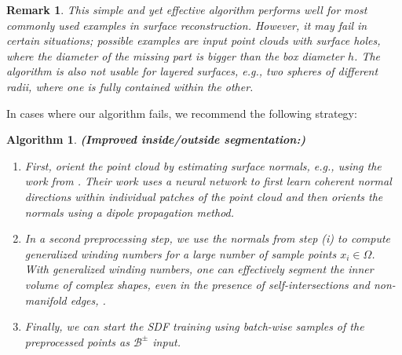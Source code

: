 \documentclass[12pt,openany]{book}
\theoremstyle{plainnormal}
\newtheorem{remark}[theorem]{Remark}
\newtheorem{algorithm}[theorem]{Algorithm}
\theoremstyle{remark}
\begin{document}
\begin{remark}
    This simple and yet effective algorithm performs well for most commonly used examples in surface reconstruction. However, it may fail in certain situations; possible examples are input point clouds with surface holes, where the diameter of the missing part is bigger than the box diameter $h$. The algorithm is also not usable for layered surfaces, e.g., two spheres of different radii, where one is fully contained within the other.
\end{remark}
    In cases where our algorithm fails, we recommend the following strategy: 
    \begin{algorithm}\label{improvedInsideOutside}\textbf{(Improved inside/outside segmentation:)}
        \begin{enumerate}
            \item First, orient the point cloud by estimating surface normals, e.g., using the work from \cite{Metzer_2021}. Their work uses a neural network to first learn coherent normal directions within individual patches of the point cloud and then orients the normals using a dipole propagation method. 
            \item In a second preprocessing step, we use the normals from step (i) to compute generalized winding numbers for a large number of sample points $x_i\in \Omega$. With generalized winding numbers, one can effectively segment the inner volume of complex shapes, even in the presence of self-intersections and non-manifold edges, \cite{10.1145/2461912.2461916}.
            \item Finally, we can start the SDF training using batch-wise samples of the preprocessed points as $\mathcal{B}^\pm$ input.
        \end{enumerate}
    \end{algorithm} 
 
\end{document}
